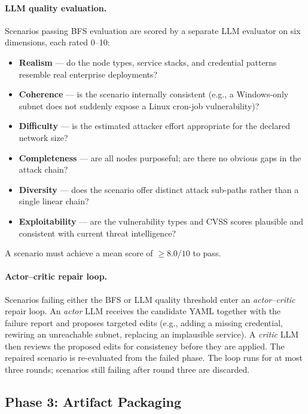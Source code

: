 \documentclass[11pt,a4paper]{article}
\begin{document}
\paragraph{LLM quality evaluation.}
Scenarios passing BFS evaluation are scored by a separate LLM evaluator on
six dimensions, each rated 0--10:

\begin{itemize}
    \item \textbf{Realism} — do the node types, service stacks, and credential
          patterns resemble real enterprise deployments?
    \item \textbf{Coherence} — is the scenario internally consistent (e.g., a
          Windows-only subnet does not suddenly expose a Linux cron-job
          vulnerability)?
    \item \textbf{Difficulty} — is the estimated attacker effort appropriate
          for the declared network size?
    \item \textbf{Completeness} — are all nodes purposeful; are there no
          obvious gaps in the attack chain?
    \item \textbf{Diversity} — does the scenario offer distinct attack sub-paths
          rather than a single linear chain?
    \item \textbf{Exploitability} — are the vulnerability types and CVSS scores
          plausible and consistent with current threat intelligence?
\end{itemize}

A scenario must achieve a mean score of $\geq 8.0/10$ to pass.

\paragraph{Actor--critic repair loop.}
Scenarios failing either the BFS or LLM quality threshold enter an
\emph{actor--critic} repair loop.  An \emph{actor} LLM receives the
candidate YAML together with the failure report and proposes targeted edits
(e.g., adding a missing credential, rewiring an unreachable subnet, replacing
an implausible service).  A \emph{critic} LLM then reviews the proposed edits
for consistency before they are applied.  The repaired scenario is
re-evaluated from the failed phase.  The loop runs for at most three rounds;
scenarios still failing after round three are discarded.

\subsection{Phase 3: Artifact Packaging}
\label{sec:phase3}
\end{document}
